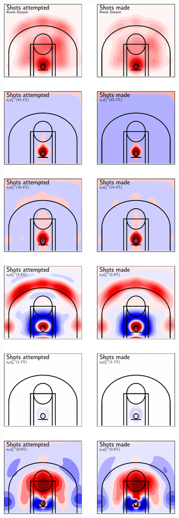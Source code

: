 \begin{figure}
    \centering
    \begin{subfigure}[b]{0.45\textwidth}
        \centering
        \includegraphics[width=\textwidth]{figures/durant_decomposition.pdf}

\end{subfigure}
\end{figure}
